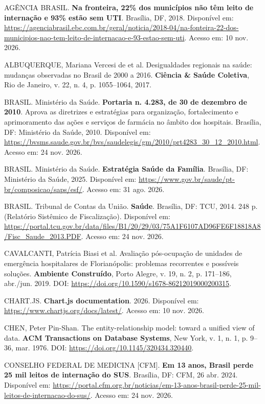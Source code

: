 \documentclass[12pt,a4paper]{article}
\begin{document}
\begingroup
\setlength{\parindent}{0pt}
\setlength{\parskip}{12pt}
\singlespacing
\raggedright

AGÊNCIA BRASIL. \textbf{Na fronteira, 22\% dos municípios não têm leito de internação e 93\% estão sem UTI}. Brasília, DF, 2018. Disponível em: \url{https://agenciabrasil.ebc.com.br/geral/noticia/2018-04/na-fonteira-22-dos-municipios-nao-tem-leito-de-internacao-e-93-estao-sem-uti}. Acesso em: 10 nov. 2026.

ALBUQUERQUE, Mariana Vercesi de et al. Desigualdades regionais na saúde: mudanças observadas no Brasil de 2000 a 2016. \textbf{Ciência \& Saúde Coletiva}, Rio de Janeiro, v. 22, n. 4, p. 1055--1064, 2017.

BRASIL. Ministério da Saúde. \textbf{Portaria n. 4.283, de 30 de dezembro de 2010}. Aprova as diretrizes e estratégias para organização, fortalecimento e aprimoramento das ações e serviços de farmácia no âmbito dos hospitais. Brasília, DF: Ministério da Saúde, 2010. Disponível em: \url{https://bvsms.saude.gov.br/bvs/saudelegis/gm/2010/prt4283_30_12_2010.html}. Acesso em: 24 nov. 2026.

BRASIL. Ministério da Saúde. \textbf{Estratégia Saúde da Família}. Brasília, DF: Ministério da Saúde, 2025. Disponível em: \url{https://www.gov.br/saude/pt-br/composicao/saps/esf/}. Acesso em: 31 ago. 2026.

BRASIL. Tribunal de Contas da União. \textbf{Saúde}. Brasília, DF: TCU, 2014. 248 p. (Relatório Sistêmico de Fiscalização). Disponível em: \url{https://portal.tcu.gov.br/data/files/B1/20/29/03/75A1F6107AD96FE6F18818A8/Fisc_Saude_2013.PDF}. Acesso em: 24 nov. 2026.

CAVALCANTI, Patrícia Biasi et al. Avaliação pós-ocupação de unidades de emergência hospitalares de Florianópolis: problemas recorrentes e possíveis soluções. \textbf{Ambiente Construído}, Porto Alegre, v. 19, n. 2, p. 171--186, abr./jun. 2019. DOI: \url{https://doi.org/10.1590/s1678-86212019000200315}.

CHART.JS. \textbf{Chart.js documentation}. 2026. Disponível em: \url{https://www.chartjs.org/docs/latest/}. Acesso em: 10 nov. 2026.

CHEN, Peter Pin-Shan. The entity-relationship model: toward a unified view of data. \textbf{ACM Transactions on Database Systems}, New York, v. 1, n. 1, p. 9--36, mar. 1976. DOI: \url{https://doi.org/10.1145/320434.320440}.

CONSELHO FEDERAL DE MEDICINA [CFM]. \textbf{Em 13 anos, Brasil perde 25 mil leitos de internação do SUS}. Brasília, DF: CFM, 26 abr. 2024. Disponível em: \url{https://portal.cfm.org.br/noticias/em-13-anos-brasil-perde-25-mil-leitos-de-internacao-do-sus/}. Acesso em: 24 nov. 2026.
\end{document}
